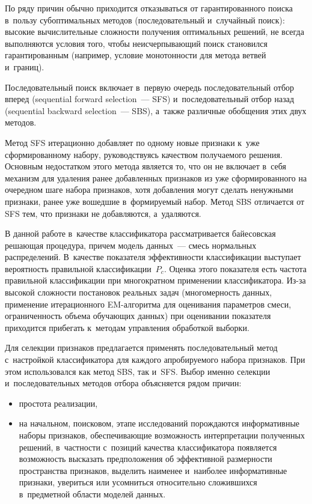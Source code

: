 \begin{multicols}{2}
     По ряду причин обычно приходится отказываться от гарантированного 
поиска в~пользу субоптимальных методов (последовательный и~случайный 
поиск): высокие вычислительные сложности получения оптимальных решений, 
не всегда выполняются условия того, чтобы неисчерпывающий поиск 
становился гарантированным (например, условие монотонности для метода 
ветвей и~границ). 
     
     Последовательный поиск включает в~первую очередь последовательный 
отбор вперед (sequential forward selection~--- SFS) и~последовательный отбор 
назад (sequential backward selection~--- SBS), а~также различные обобщения 
этих двух методов.
     
     Метод SFS итерационно добавляет по одному новые признаки к~уже 
сформированному набору, руководствуясь качеством получаемого решения. 
Основным недостатком этого метода является то, что он не включает в~себя 
механизм для удаления ранее добавленных признаков из уже сформированного 
на очередном шаге набора признаков, хотя добавления могут сделать 
ненужными признаки, ранее уже вошедшие в~формируемый набор. Метод SBS 
отличается от SFS тем, что признаки не добавляются, а~удаляются.
     
     В данной работе в~качестве классификатора рассматривается байесовская 
решающая процедура, причем модель данных~--- смесь нормальных 
распределений. В~качестве показателя эффективности классификации 
выступает вероятность правильной классификации~$P_c$. Оценка этого 
показателя есть частота правильной классификации при многократном 
применении классификатора. Из-за высокой сложности постановок реальных 
задач (многомерность данных, применение итерационного EM-ал\-го\-рит\-ма 
для оценивания параметров смеси, ограниченность объема обучающих данных) 
при оценивании показателя приходится прибегать к~методам управления 
обработкой выборки.
     
     Для селекции признаков предлагается применять последовательный 
метод с~настройкой классификатора для каждого апробируемого набора 
признаков. При этом использовался как метод SBS, так и~SFS. Выбор именно 
селекции и~последовательных методов отбора объясняется рядом причин: 
     \begin{itemize}
\item простота реализации, 
\item на начальном, поисковом, этапе исследований порождаются 
информативные наборы признаков, обеспечивающие возможность 
интерпретации полученных решений, в~частности с~позиций качества 
классификатора появляется возможность высказать предположения об 
эффективной размерности пространства признаков, выделить наименее 
и~наиболее информативные признаки, увериться или усомниться 
относительно сложившихся в~предметной об\-ласти моделей данных. 
\end{itemize}


\end{multicols}

